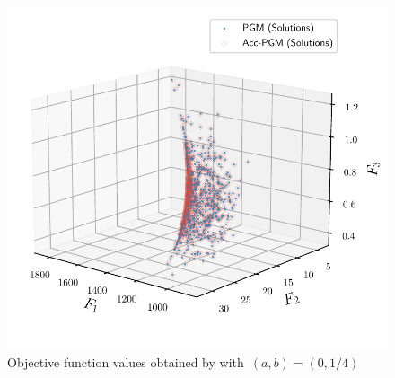 \documentclass[../main]{subfiles}
\begin{document}
\begin{figure}[htbp]
\begin{minipage}[b]{.49\hsize}
    \end{minipage}
    \begin{minipage}[b]{.49\hsize}
        \centering
        \includegraphics[width=\textwidth]{figs/FDS_CONSTRAINED.pdf}
    \end{minipage}
    \caption{Objective function values obtained by  with~$(a, b) = (0, 1 / 4)$}
\end{figure}
\end{document}
